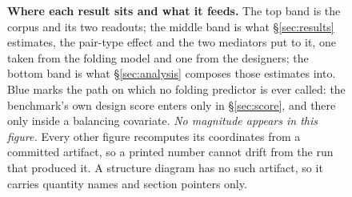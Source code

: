 \documentclass[11pt]{article}
\begin{document}
\begin{figure}[!t]
\centering

\caption{\textbf{Where each result sits and what it feeds.} The top band is the corpus and its two
readouts; the middle band is what \S\ref{sec:results} estimates, the pair-type effect and the two
mediators put to it, one taken from the folding model and one from the designers; the bottom band
is what \S\ref{sec:analysis} composes those estimates into. Blue marks the path on which no folding
predictor is ever called: the benchmark's own design score enters only in \S\ref{sec:score}, and
there only inside a balancing covariate. \emph{No magnitude appears in this figure.} Every other
figure recomputes its coordinates from a committed artifact, so a printed number cannot drift from
the run that produced it. A structure diagram has no such artifact, so it carries quantity names
and section pointers only.}
\label{fig:arch}
\end{figure}
\end{document}
